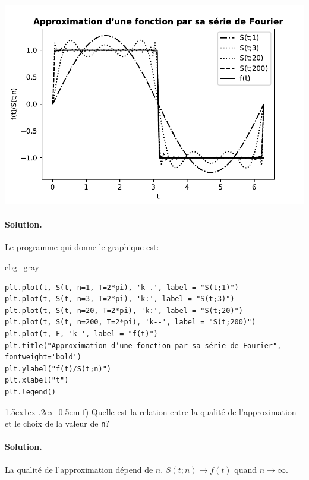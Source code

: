 \documentclass[%
oneside,                 %
final,                   %
10pt,french]{article}
\makeatletter
\newenvironment{_cod_tight}[1]{
   \def\FrameCommand{\colorbox{#1}}
   \FrameRule0.6pt\MakeFramed {\FrameRestore}\vskip3mm}
   {\vskip0mm\endMakeFramed}
\newenvironment{cod}[1]{
\bgroup\rmfamily
\fboxsep=0mm\relax
\begin{_cod_tight}{#1}
\list{}{\parsep=-2mm\parskip=0mm\topsep=0pt\leftmargin=2mm
\rightmargin=2\leftmargin\leftmargin=4pt\relax}
\item\relax}
{\endlist\end{_cod_tight}\egroup}
\newenvironment{doconceexercise}{}{}
\newcommand\subex{\@startsection{paragraph}{4}{\z@}%
                  {1.5ex\@plus1ex \@minus.2ex}%
                  {-0.5em}%
                  {\normalfont\normalsize\bfseries}}
\makeatother
\begin{document}
\begin{doconceexercise}
\centerline{\includegraphics[width=1.0\linewidth]{imgs/fourier.pdf}}

\vspace{6mm}




\paragraph{Solution.}
Le programme qui donne le graphique est:
\begin{cod}{cbg_gray}\begin{verbatim}
plt.plot(t, S(t, n=1, T=2*pi), 'k-.', label = "S(t;1)")
plt.plot(t, S(t, n=3, T=2*pi), 'k:', label = "S(t;3)")
plt.plot(t, S(t, n=20, T=2*pi), 'k:', label = "S(t;20)")
plt.plot(t, S(t, n=200, T=2*pi), 'k--', label = "S(t;200)")
plt.plot(t, F, 'k-', label = "f(t)")
plt.title("Approximation d’une fonction par sa série de Fourier", fontweight='bold')
plt.ylabel("f(t)/S(t;n)")
plt.xlabel("t")
plt.legend()
\end{verbatim}
\end{cod}
\noindent


\subex{f)}
Quelle est la relation entre la qualité de l'approximation et le choix de la valeur de \texttt{n}?


\paragraph{Solution.}
La qualité de l'approximation dépend de $n$. $S(t;n)\rightarrow f(t)$ quand $n\rightarrow\infty$.


\end{doconceexercise}
\end{document}
